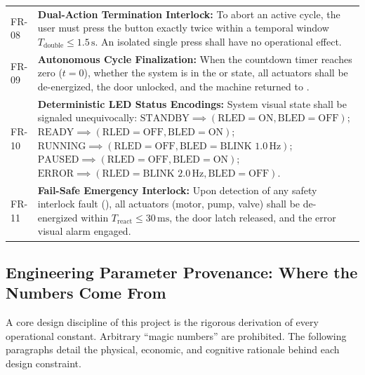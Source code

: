 \begin{longtable}{L{1.4cm}L{13.1cm}}
  FR-08 & \textbf{Dual-Action Termination Interlock:} To abort an active cycle, the user must press the  button exactly twice within a temporal window $T_{\text{double}} \le 1.5\,\text{s}$. An isolated single press shall have no operational effect. \\
  FR-09 & \textbf{Autonomous Cycle Finalization:} When the countdown timer reaches zero ($t = 0$), whether the system is in the  or  state, all actuators shall be de-energized, the door unlocked, and the machine returned to . \\
  FR-10 & \textbf{Deterministic LED Status Encodings:} System visual state shall be signaled unequivocally:
          $\text{STANDBY} \implies (\text{RLED}=\text{ON}, \text{BLED}=\text{OFF})$;
          $\text{READY} \implies (\text{RLED}=\text{OFF}, \text{BLED}=\text{ON})$;
          $\text{RUNNING} \implies (\text{RLED}=\text{OFF}, \text{BLED}=\text{BLINK } 1.0\,\text{Hz})$;
          $\text{PAUSED} \implies (\text{RLED}=\text{OFF}, \text{BLED}=\text{ON})$;
          $\text{ERROR} \implies (\text{RLED}=\text{BLINK } 2.0\,\text{Hz}, \text{BLED}=\text{OFF})$. \\
  FR-11 & \textbf{Fail-Safe Emergency Interlock:} Upon detection of any safety interlock fault (), all actuators (motor, pump, valve) shall be de-energized within $T_{\text{react}} \le 30\,\text{ms}$, the door latch released, and the error visual alarm engaged. \\
\end{longtable}

\subsection{Engineering Parameter Provenance: Where the Numbers Come From}
\label{sec:why-numbers}

A core design discipline of this project is the rigorous derivation of every operational constant.
Arbitrary ``magic numbers'' are prohibited. The following paragraphs detail the physical,
economic, and cognitive rationale behind each design constraint.



